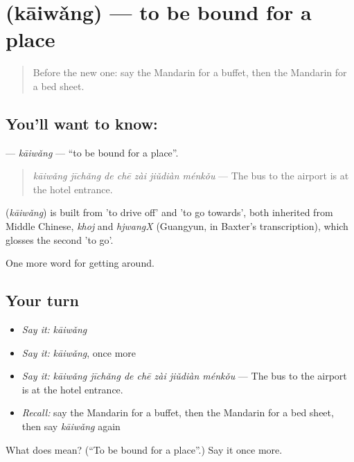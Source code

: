 \section[\texorpdfstring{\zh{开往} (kāiwǎng)}{开往 (kāiwǎng)}]{ (kāiwǎng) — to be bound for a place}

\label{lesson:ZH-C427-kaiwang}



\begin{quote}
Before the new one: say the Mandarin for a buffet, then the Mandarin for a bed sheet.
\end{quote}

\subsection*{You'll want to know: }
\textbf{} — \emph{kāiwǎng} — \textquotedblleft{}to be bound for a place\textquotedblright{}.

\begin{quote}
\textbf{} \emph{kāiwǎng jīchǎng de chē zài jiǔdiàn ménkǒu} — The bus to the airport is at the hotel entrance.
\end{quote}

\begin{cousinweb}
\textbf{} (\emph{kāiwǎng}) is built from  'to drive off' and  'to go towards', both inherited from Middle Chinese, \emph{khoj} and \emph{hjwangX} (Guangyun, in Baxter's transcription), which glosses the second 'to go'.
\end{cousinweb}

\begin{grammarlens}[title={What you've built}]
One more word for getting around.
\end{grammarlens}

\subsection*{Your turn}
\begin{itemize}
\raggedright
  \item \emph{Say it:} \emph{kāiwǎng}
  \item \emph{Say it:} \emph{kāiwǎng}, once more
  \item \emph{Say it:} \emph{kāiwǎng jīchǎng de chē zài jiǔdiàn ménkǒu} — The bus to the airport is at the hotel entrance.
  \item \emph{Recall:} say the Mandarin for a buffet, then the Mandarin for a bed sheet, then say \emph{kāiwǎng} again
\end{itemize}

\begin{tcolorbox}[breakable,colback=teal!4,colframe=teal!35!black,title={Before you move on}]
What does  mean? (\textquotedblleft{}To be bound for a place\textquotedblright{}.) Say it once more.
\end{tcolorbox}
